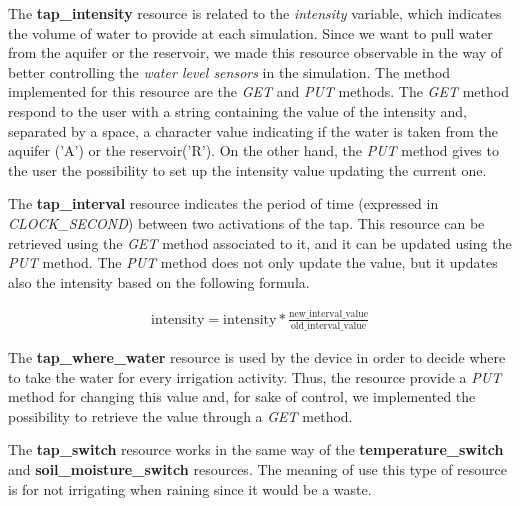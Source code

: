 The \textbf{tap\_intensity} resource is related to the \textit{intensity} variable, which indicates the volume of water to provide at each simulation. Since we want to pull water from the aquifer or the reservoir, we made this resource observable in the way of better controlling the \textit{water level sensors} in the simulation. The method implemented for this resource are the \textit{GET} and \textit{PUT} methods. The \textit{GET} method respond to the user with a string containing the value of the intensity and, separated by a space, a character value indicating if the water is taken from the aquifer ('A') or the reservoir('R'). On the other hand, the \textit{PUT} method gives to the user the possibility to set up the intensity value updating the current one.

The \textbf{tap\_interval} resource indicates the period of time (expressed in \textit{CLOCK\_SECOND}) between two activations of the tap. This resource can be retrieved using the \textit{GET} method associated to it, and it can be updated using the \textit{PUT} method. The \textit{PUT} method does not only update the value, but it updates also the intensity based on the following formula.

\begin{equation}\label{eq1}
  \begin{gathered}
    \text{intensity} = \text{intensity} * \frac{\text{new\_interval\_value}}{\text{old\_interval\_value}}
  \end{gathered}
\end{equation}

The \textbf{tap\_where\_water} resource is used by the device in order to decide where to take the water for every irrigation activity. Thus, the resource provide a \textit{PUT} method for changing this value and, for sake of control, we implemented the possibility to retrieve the value through a \textit{GET} method.

The \textbf{tap\_switch} resource works in the same way of the \textbf{temperature\_switch} and \textbf{soil\_moisture\_switch} resources. The meaning of use this type of resource is for not irrigating when raining since it would be a waste.